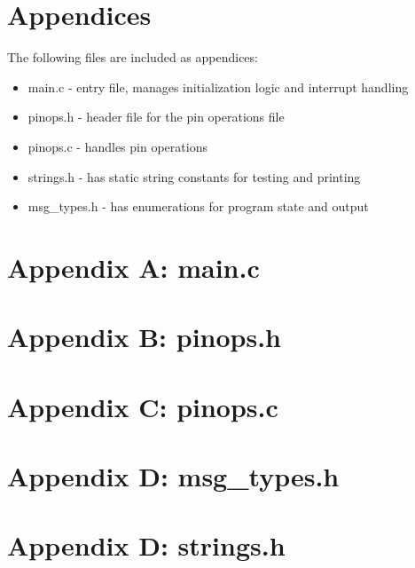 \documentclass[letterpaper,11pt]{texMemo} %
\begin{document}
\section*{Appendices}
The following files are included as appendices:
\begin{itemize}
\item main.c - entry file, manages initialization logic and interrupt handling
\item pinops.h - header file for the pin operations file 
\item pinops.c - handles pin operations
\item strings.h - has static string constants for testing and printing
\item msg_types.h - has enumerations for program state and output
\end{itemize}
\newpage

\section*{Appendix A: main.c}
\begin{tiny}

\end{tiny}
\newpage
\section*{Appendix B: pinops.h}
\begin{tiny}

\end{tiny}
\newpage
\section*{Appendix C: pinops.c}
\begin{tiny}

\end{tiny}
\newpage
\section*{Appendix D: msg_types.h}
\begin{tiny}

\end{tiny}
\newpage
\section*{Appendix D: strings.h}
\begin{tiny}

\end{tiny}
\end{document}
